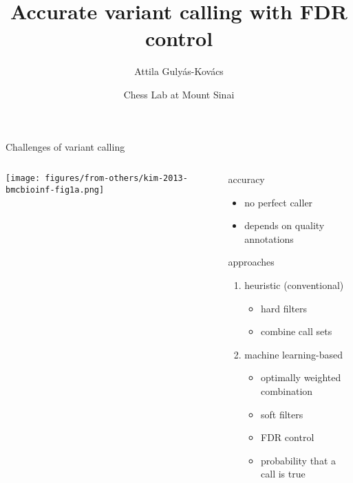 \documentclass{beamer} %
\title{Accurate variant calling with FDR control}
\author{Attila Guly\'{a}s-Kov\'{a}cs}
\date{Chess Lab at Mount Sinai}
\begin{document}
\begin{frame}[plain, label=title]
\maketitle
\end{frame}

\begin{frame}{Challenges of variant calling}
\begin{columns}[t]
\begin{column}{0.5\textwidth}

\texttt{[image: figures/from-others/kim-2013-bmcbioinf-fig1a.png]}

\end{column}
\begin{column}{0.5\textwidth}
{\large accuracy}
\begin{itemize}
\item no perfect caller
\item depends on quality annotations
\end{itemize}
\bigskip
{\large approaches}
\begin{enumerate}
\item heuristic (conventional)
\begin{itemize}
\item hard filters
\item combine call sets
\end{itemize}
\item machine learning-based
\begin{itemize}
\item optimally weighted combination
\item soft filters 
\item FDR control
\item probability that a call is true
\end{itemize}
\end{enumerate}
\end{column}
\end{columns}
\end{frame}
\end{document}
